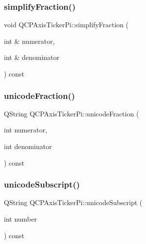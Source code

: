 \subsubsection{\texorpdfstring{simplify\+Fraction()}{simplifyFraction()}}
{\footnotesize\ttfamily void Q\+C\+P\+Axis\+Ticker\+Pi\+::simplify\+Fraction (\begin{DoxyParamCaption}\item[{int \&}]{numerator,  }\item[{int \&}]{denominator }\end{DoxyParamCaption}) const\hspace{0.3cm}{\ttfamily [protected]}}

\mbox{\label{class_q_c_p_axis_ticker_pi_ade6f7e49238e986e9aed74178a78d8d3}} 
\subsubsection{\texorpdfstring{unicode\+Fraction()}{unicodeFraction()}}
{\footnotesize\ttfamily Q\+String Q\+C\+P\+Axis\+Ticker\+Pi\+::unicode\+Fraction (\begin{DoxyParamCaption}\item[{int}]{numerator,  }\item[{int}]{denominator }\end{DoxyParamCaption}) const\hspace{0.3cm}{\ttfamily [protected]}}

\mbox{\label{class_q_c_p_axis_ticker_pi_a5b3bb340adb888a30a96225e1ca23c7a}} 
\subsubsection{\texorpdfstring{unicode\+Subscript()}{unicodeSubscript()}}
{\footnotesize\ttfamily Q\+String Q\+C\+P\+Axis\+Ticker\+Pi\+::unicode\+Subscript (\begin{DoxyParamCaption}\item[{int}]{number }\end{DoxyParamCaption}) const\hspace{0.3cm}{\ttfamily [protected]}}

